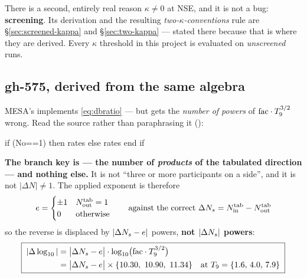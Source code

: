 \begin{warn}
There is a second, entirely real reason $\kappa \ne 0$ at NSE, and it is not a
bug: \textbf{screening}. Its derivation and the resulting
\emph{two-$\kappa$-conventions} rule are \S\ref{sec:screened-kappa} and
\S\ref{sec:two-kappa} --- stated there because that is where they are derived.
Every $\kappa$ threshold in this project is evaluated on \emph{unscreened} runs.
\end{warn}

\subsection{gh-575, derived from the same algebra}
\label{sec:gh575}

MESA's  implements \eqref{eq:dbratio} --- but gets the
\emph{number of powers} of $\mathrm{fac}\cdot T_{9}^{3/2}$ wrong. Read the source rather
than paraphrasing it ():

\begin{srclisting}
if (No==1) then
   rates%
else
   rates%
end if
\end{srclisting}

\textbf{The branch key is  --- the number of \emph{products} of
the tabulated direction --- and nothing else.} It is not ``three or more
participants on a side'', and it is not $|\Delta N| \ne 1$. The applied exponent
is therefore
%
\begin{equation*}
e = \begin{cases} \pm1 & N_{\rm out}^{\rm tab} = 1\\
                  0 & \text{otherwise}\end{cases}
\qquad\text{against the correct }
\Delta N_{s} = N_{\rm in}^{\rm tab} - N_{\rm out}^{\rm tab}
\end{equation*}
%
so the reverse is displaced by $|\Delta N_{s} - e|$ powers, \textbf{not $|\Delta N_{s}|$
powers}:
%
\begin{equation}
\boxed{\;
\begin{aligned}
|\Delta\log_{10}| &= \bigl|\Delta N_{s} - e\bigr| \cdot
  \log_{10}\bigl(\mathrm{fac}\cdot T_{9}^{3/2}\bigr) \\
&= \bigl|\Delta N_{s} - e\bigr| \times \{10.30,\ 10.90,\ 11.34\}
  \quad\text{at } T_{9} = \{1.6,\,4.0,\,7.9\}
\end{aligned}
\;}
\label{eq:gh575}
\end{equation}


